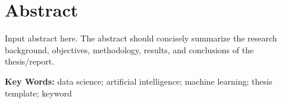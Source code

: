 \chapter*{Abstract}
{}

Input abstract here. The abstract should concisely summarize the research background, objectives, methodology, results, and conclusions of the thesis/report.

\vspace{1.0cm}

\noindent\textbf{Key Words:} data science; artificial intelligence; machine learning; thesis template; keyword
